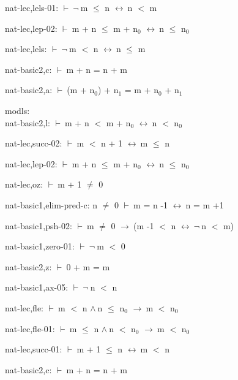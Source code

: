 \documentclass[a4paper]{article}
\newcommand{\Fol}{\mbox{$\vdash\ $}}
\newcommand{\Not}{\mbox{$\neg\ $}}
\newcommand{\And}{\mbox{$\wedge\ $}}
\newcommand{\Imp}{\mbox{$\rightarrow\ $}}
\newcommand{\Equiv}{\mbox{$\leftrightarrow\ $}}
\begin{document}
nat-lec,lels-01: 
 \Fol \Not m $\le$ n \Equiv n $<$ m



nat-lec,lep-02: 
 \Fol m + n $\le$ m + $\mbox{n}_{0}$ \Equiv n $\le$ $\mbox{n}_{0}$



nat-lec,lels: 
 \Fol \Not m $<$ n \Equiv n $\le$ m



nat-basic2,c: 
 \Fol m + n = n + m



nat-basic2,a: 
 \Fol (m + $\mbox{n}_{0}$) + $\mbox{n}_{1}$ = m + $\mbox{n}_{0}$ + $\mbox{n}_{1}$



\bigskip

modls:\\ nat-basic2,l: 
 \Fol m + n $<$ m + $\mbox{n}_{0}$ \Equiv n $<$ $\mbox{n}_{0}$



nat-lec,succ-02: 
 \Fol m $<$ n + 1 \Equiv m $\le$ n



nat-lec,lep-02: 
 \Fol m + n $\le$ m + $\mbox{n}_{0}$ \Equiv n $\le$ $\mbox{n}_{0}$



nat-lec,oz: 
 \Fol m + 1 $\neq$ 0



nat-basic1,elim-pred-c: 
n $\neq$ 0
 \Fol m = n -1 \Equiv n = m +1



nat-basic1,psh-02: 
 \Fol m $\neq$ 0 \Imp (m -1 $<$ n \Equiv \Not n $<$ m)



nat-basic1,zero-01: 
 \Fol \Not m $<$ 0



nat-basic2,z: 
 \Fol 0 + m = m



nat-basic1,ax-05: 
 \Fol \Not n $<$ n



nat-lec,fle: 
 \Fol m $<$ n \And n $\le$ $\mbox{n}_{0}$ \Imp m $<$ $\mbox{n}_{0}$



nat-lec,fle-01: 
 \Fol m $\le$ n \And n $<$ $\mbox{n}_{0}$ \Imp m $<$ $\mbox{n}_{0}$



nat-lec,succ-01: 
 \Fol m + 1 $\le$ n \Equiv m $<$ n



nat-basic2,c: 
 \Fol m + n = n + m
\end{document}
